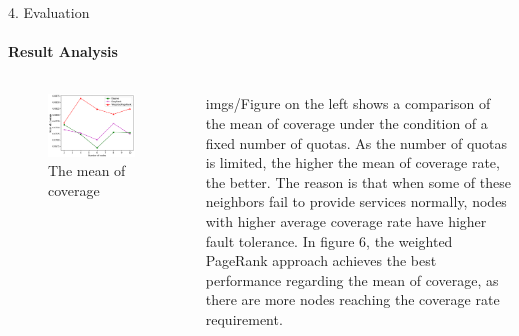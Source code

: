 \documentclass{beamer}		%
\begin{document}
\begin{frame}{4. Evaluation}
\framesubtitle{Result Analysis}
\begin{columns}
\begin{figure}
    \centering
    \includegraphics[width=0.9\textwidth]{imgs/Figure6.png}
    \caption{The mean of coverage}
\end{figure}
imgs/Figure on the left shows a comparison of the mean of coverage under the condition of a fixed number of quotas. As the number of quotas is limited, the higher the mean of coverage rate, the better. The reason is that when some of these neighbors fail to provide services normally, nodes with higher average coverage rate have higher fault tolerance. In figure 6, the weighted PageRank approach achieves the best performance regarding the mean of coverage, as there are more nodes reaching the coverage rate requirement.
\end{columns}
\end{frame}
\end{document}
